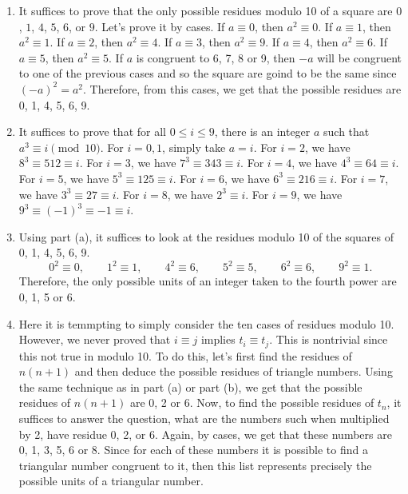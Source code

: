 \begin{solution}
    \begin{enumerate}
        \item It suffices to prove that the only possible residues modulo 10 of a square are $0$, $1$, $4$, $5$, $6$, or $9$. Let's prove it by cases. If $a \equiv 0$, then $a^2 \equiv 0$. If $a \equiv 1$, then $a^2 \equiv 1$. If $a \equiv 2$, then $a^2 \equiv 4$. If $a \equiv 3$, then $a^2 \equiv 9$. If $a \equiv 4$, then $a^2 \equiv 6$. If $a \equiv 5$, then $a^2 \equiv 5$. If $a$ is congruent to 6, 7, 8 or 9, then $-a$ will be congruent to one of the previous cases and so the square are goind to be the same since $(-a)^2 = a^2$. Therefore, from this cases, we get that the possible residues are 0, 1, 4, 5, 6, 9. 
        \item It suffices to prove that for all $0 \leq i \leq 9$, there is an integer $a$ such that $a^3 \equiv i \pmod{10}$. For $i = 0,1$, simply take $a = i$. For $i = 2$, we have $8^3 \equiv 512 \equiv i$. For $i = 3$, we have $7^3 \equiv 343 \equiv i$. For $i = 4$, we have $4^3 \equiv 64 \equiv i$. For $i = 5$, we have $5^3 \equiv 125 \equiv i$. For $i = 6$, we have $6^3 \equiv 216 \equiv i$. For $i = 7$, we have $3^3 \equiv 27 \equiv i$. For $i = 8$, we have $2^3 \equiv i$. For $i = 9$, we have $9^3 \equiv (-1)^3 \equiv -1 \equiv i$.
        \item Using part (a), it suffices to look at the residues modulo 10 of the squares of 0, 1, 4, 5, 6, 9. 
        $$0^2 \equiv 0, \qquad 1^2 \equiv 1, \qquad 4^2 \equiv 6, \qquad 5^2 \equiv 5, \qquad 6^2 \equiv 6, \qquad 9^2 \equiv 1.$$
        Therefore, the only possible units of an integer taken to the fourth power are 0, 1, 5 or 6.
        \item Here it is temmpting to simply consider the ten cases of residues modulo 10. However, we never proved that $i \equiv j$ implies $t_i \equiv t_j$. This is nontrivial since this not true in modulo 10. To do this, let's first find the residues of $n(n+1)$ and then deduce the possible residues of triangle numbers. Using the same technique as in part (a) or part (b), we get that the possible residues of $n(n+1)$ are 0, 2 or 6. Now, to find the possible residues of $t_n$, it suffices to answer the question, what are the numbers such when multiplied by 2, have residue 0, 2, or 6. Again, by cases, we get that these numbers are 0, 1, 3, 5, 6 or 8. Since for each of these numbers it is possible to find a triangular number congruent to it, then this list represents precisely the possible units of a triangular number.
    \end{enumerate}
\end{solution}

